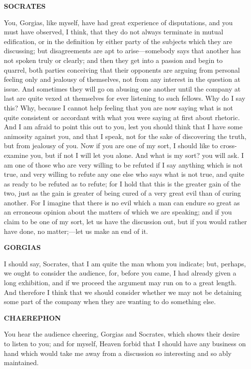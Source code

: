 \documentclass[11pt,letter]{article}
\begin{document}
\par \textbf{SOCRATES}
\par   You, Gorgias, like myself, have had great experience of disputations, and you must have observed, I think, that they do not always terminate in mutual edification, or in the definition by either party of the subjects which they are discussing; but disagreements are apt to arise—somebody says that another has not spoken truly or clearly; and then they get into a passion and begin to quarrel, both parties conceiving that their opponents are arguing from personal feeling only and jealousy of themselves, not from any interest in the question at issue. And sometimes they will go on abusing one another until the company at last are quite vexed at themselves for ever listening to such fellows. Why do I say this? Why, because I cannot help feeling that you are now saying what is not quite consistent or accordant with what you were saying at first about rhetoric. And I am afraid to point this out to you, lest you should think that I have some animosity against you, and that I speak, not for the sake of discovering the truth, but from jealousy of you. Now if you are one of my sort, I should like to cross-examine you, but if not I will let you alone. And what is my sort? you will ask. I am one of those who are very willing to be refuted if I say anything which is not true, and very willing to refute any one else who says what is not true, and quite as ready to be refuted as to refute; for I hold that this is the greater gain of the two, just as the gain is greater of being cured of a very great evil than of curing another. For I imagine that there is no evil which a man can endure so great as an erroneous opinion about the matters of which we are speaking; and if you claim to be one of my sort, let us have the discussion out, but if you would rather have done, no matter;—let us make an end of it.

\par \textbf{GORGIAS}
\par   I should say, Socrates, that I am quite the man whom you indicate; but, perhaps, we ought to consider the audience, for, before you came, I had already given a long exhibition, and if we proceed the argument may run on to a great length. And therefore I think that we should consider whether we may not be detaining some part of the company when they are wanting to do something else.

\par \textbf{CHAEREPHON}
\par   You hear the audience cheering, Gorgias and Socrates, which shows their desire to listen to you; and for myself, Heaven forbid that I should have any business on hand which would take me away from a discussion so interesting and so ably maintained.
\end{document}
